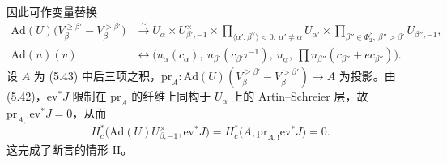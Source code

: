 因此可作变量替换
\begin{equation}
\begin{aligned}
\mathrm{Ad}(U)\big(V^{\ge\beta'}_\beta-V^{>\beta'}_\beta\big)&\xrightarrow{\ \sim\ }U_\alpha\times U^\times_{\beta',-1}\times\prod_{\langle\alpha',\beta^\vee\rangle<0,\ \alpha'\neq\alpha}U_{\alpha'}\times\prod_{\beta''\in\Phi^\beta_2,\ \beta''>\beta'}U_{\beta'',-1},\\
\mathrm{Ad}(u)(v)&\leftrightarrow\Big(u_\alpha(c_\alpha),\ u_{\beta'}(c_{\beta'}\tau^{-1}),\ u_{\underline\alpha},\ \prod u_{\beta''}(c_{\beta''}+ec_{\beta''})\Big).
\end{aligned}
\end{equation}
设 $A$ 为 (5.43) 中后三项之积，$\mathrm{pr}_A:\mathrm{Ad}(U)(V^{\ge\beta'}_\beta-V^{>\beta'}_\beta)\to A$ 为投影。由 (5.42)，$\mathrm{ev}^*J$ 限制在 $\mathrm{pr}_A$ 的纤维上同构于 $U_\alpha$ 上的 Artin--Schreier 层，故 $\mathrm{pr}_{A,!}\mathrm{ev}^*J=0$，从而
\[
H^*_c\big(\mathrm{Ad}(U)U^\times_{\beta,-1},\mathrm{ev}^*J\big)=H^*_c\big(A,\mathrm{pr}_{A,!}\mathrm{ev}^*J\big)=0.
\]
这完成了断言的情形 II。
